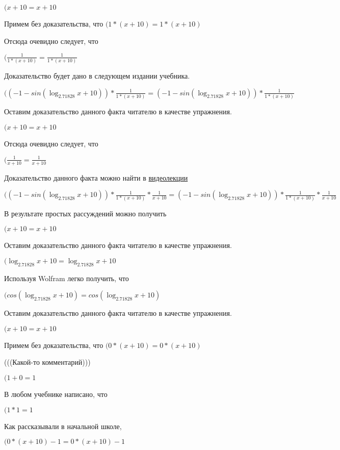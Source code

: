 \documentclass[12pt,a4paper,fleqn]{article}
\theoremstyle{definition}
\begin{document}
$( x  +  10  =  x  +  10 $

Примем без доказательства, что
$( 1  * ( x  +  10 ) =  1  * ( x  +  10 )$

Отсюда очевидно следует, что

$(\frac{ 1 }{ 1  * ( x  +  10 )}
 = \frac{ 1 }{ 1  * ( x  +  10 )}
$

Доказательство будет дано в следующем издании учебника.

$(( -1  - sin(\log_{ 2.71828 }{ x  +  10 })) * \frac{ 1 }{ 1  * ( x  +  10 )}
 = ( -1  - sin(\log_{ 2.71828 }{ x  +  10 })) * \frac{ 1 }{ 1  * ( x  +  10 )}
$

Оставим доказательство данного факта читателю в качестве упражнения.

$( x  +  10  =  x  +  10 $

Отсюда очевидно следует, что

$(\frac{ 1 }{ x  +  10 }
 = \frac{ 1 }{ x  +  10 }
$

Доказательство данного факта можно найти в \href{https://www.youtube.com/watch?v=dQw4w9WgXcQ}{видеолекции}

$(( -1  - sin(\log_{ 2.71828 }{ x  +  10 })) * \frac{ 1 }{ 1  * ( x  +  10 )}
 * \frac{ 1 }{ x  +  10 }
 = ( -1  - sin(\log_{ 2.71828 }{ x  +  10 })) * \frac{ 1 }{ 1  * ( x  +  10 )}
 * \frac{ 1 }{ x  +  10 }
$

В результате простых рассуждений можно получить

$( x  +  10  =  x  +  10 $

Оставим доказательство данного факта читателю в качестве упражнения.

$(\log_{ 2.71828 }{ x  +  10 } = \log_{ 2.71828 }{ x  +  10 }$

Используя Wolfram легко получить, что

$(cos(\log_{ 2.71828 }{ x  +  10 }) = cos(\log_{ 2.71828 }{ x  +  10 })$

Оставим доказательство данного факта читателю в качестве упражнения.

$( x  +  10  =  x  +  10 $

Примем без доказательства, что
$( 0  * ( x  +  10 ) =  0  * ( x  +  10 )$

(((Какой-то комментарий)))

$( 1  +  0  =  1 $

В любом учебнике написано, что

$( 1  *  1  =  1 $

Как рассказывали в начальной школе,

$( 0  * ( x  +  10 ) -  1  =  0  * ( x  +  10 ) -  1 $
\end{document}
